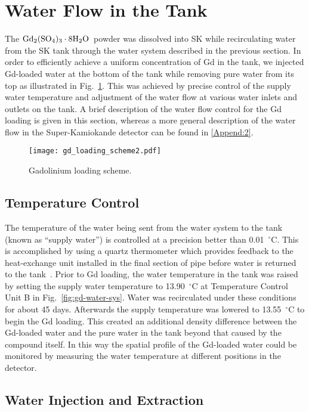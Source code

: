 \documentclass[preprint,12pt]{elsarticle}
\newcommand{\GdSOw}{$\rm Gd_2(\rm SO_4)_3\cdot \rm 8H_2O$\ }
\begin{document}
\section{Water Flow in the Tank} %
\label{sec:water_flow}
The \GdSOw powder was dissolved into SK while recirculating water from the SK tank through the water system described in the previous section. 
In order to efficiently achieve a uniform concentration of Gd in the tank, we injected Gd-loaded water at the bottom of the tank while removing pure water from its top as illustrated in Fig.~\ref{fig:gd_loading_scheme}.
This was achieved by precise control of the supply water temperature and adjustment of the water flow at various water inlets and outlets on the tank. 
A brief description of the water flow control for the Gd loading is given in this section, whereas a more general description of the water flow in the  Super-Kamiokande detector can be found in \ref{Append:2}.

\begin{figure}[htb]
\centering\texttt{[image: gd\_loading\_scheme2.pdf]}
\caption{Gadolinium loading scheme.}
\label{fig:gd_loading_scheme}
\end{figure}

\subsection{Temperature Control}

The temperature of the water being sent from the water system to the tank (known as ``supply water'') is controlled at a precision better than 0.01~$^\circ$C.  This is accomplished by using a quartz thermometer which provides feedback to the heat-exchange unit installed in the final section of pipe before water is returned to the tank~\cite{Sekiya:2015rla}.
Prior to Gd loading, the water temperature in the tank was raised by setting the supply water temperature to 13.90~$^\circ$C at Temperature Control Unit B in Fig.~\ref{fig:gd-water-sys}. 
Water was recirculated under these conditions for about 45 days.
Afterwards the supply temperature was lowered to 13.55~$^\circ$C to begin the Gd loading. 
This created an additional density difference between the  Gd-loaded water and the pure water in the tank beyond that caused by the compound itself.
In this way the spatial profile of the Gd-loaded water could be monitored by measuring the water temperature at different positions in the detector.


\subsection{Water Injection and Extraction}
\end{document}
